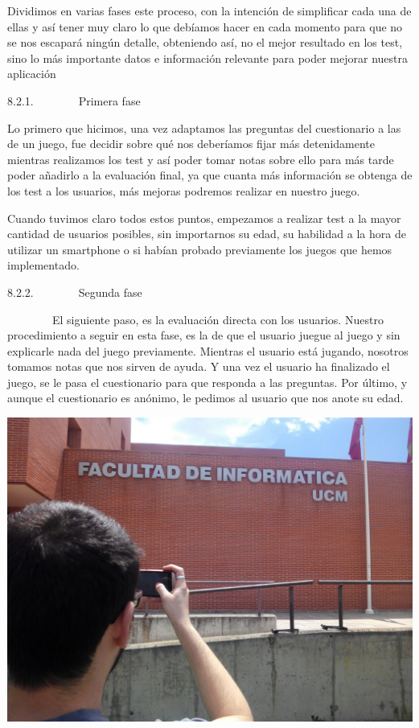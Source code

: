 \documentclass[]{article}
\begin{document}
Dividimos en varias fases este proceso, con la intención de simplificar
cada una de ellas y así tener muy claro lo que debíamos hacer en cada
momento para que no se nos escapará ningún detalle, obteniendo así, no
el mejor resultado en los test, sino lo más importante datos e
información relevante para poder mejorar nuestra aplicación

8.2.1.~~~~~~~~Primera fase

Lo primero que hicimos, una vez adaptamos las preguntas del cuestionario
a las de un juego, fue decidir sobre qué nos deberíamos fijar más
detenidamente mientras realizamos los test y así poder tomar notas sobre
ello para más tarde poder añadirlo a la evaluación final, ya que cuanta
más información se obtenga de los test a los usuarios, más mejoras
podremos realizar en nuestro juego.

Cuando tuvimos claro todos estos puntos, empezamos a realizar test a la
mayor cantidad de usuarios posibles, sin importarnos su edad, su
habilidad a la hora de utilizar un smartphone o si habían probado
previamente los juegos que hemos implementado.

8.2.2.~~~~~~~~Segunda fase

~~~~~~~~El siguiente paso, es la evaluación directa con los usuarios.
Nuestro procedimiento a seguir en esta fase, es la de que el usuario
juegue al juego y sin explicarle nada del juego previamente. Mientras el
usuario está jugando, nosotros tomamos notas que nos sirven de ayuda. Y
una vez el usuario ha finalizado el juego, se le pasa el cuestionario
para que responda a las preguntas. Por último, y aunque el cuestionario
es anónimo, le pedimos al usuario que nos anote su edad.

\includegraphics{images/image04.jpg}
\end{document}
